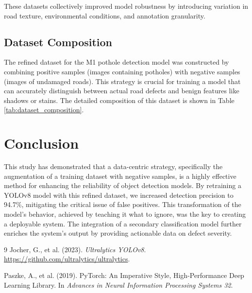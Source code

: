 \documentclass[twocolumn]{article}
\begin{document}
These datasets collectively improved model robustness by introducing variation in road texture, environmental conditions, and annotation granularity.

\subsection{Dataset Composition}
The refined dataset for the M1 pothole detection model was constructed by combining positive samples (images containing potholes) with negative samples (images of undamaged roads). This strategy is crucial for training a model that can accurately distinguish between actual road defects and benign features like shadows or stains. The detailed composition of this dataset is shown in Table \ref{tab:dataset_composition}.

\begin{table}[H]
\centering
\caption{Composition of the Refined Pothole Detection Dataset (M1)}
\label{tab:dataset_composition}
\end{table}

\section{Conclusion}
This study has demonstrated that a data-centric strategy, specifically the augmentation of a training dataset with negative samples, is a highly effective method for enhancing the reliability of object detection models. By retraining a YOLOv8 model with this refined dataset, we increased detection precision to 94.7\%, mitigating the critical issue of false positives. This transformation of the model's behavior, achieved by teaching it what to ignore, was the key to creating a deployable system. The integration of a secondary classification model further enriches the system's output by providing actionable data on defect severity.

\begin{thebibliography}{9}
Jocher, G., et al. (2023). \textit{Ultralytics YOLOv8}. \url{https://github.com/ultralytics/ultralytics}.

Paszke, A., et al. (2019). PyTorch: An Imperative Style, High-Performance Deep Learning Library. In \textit{Advances in Neural Information Processing Systems 32}.
\end{thebibliography}
\end{document}
